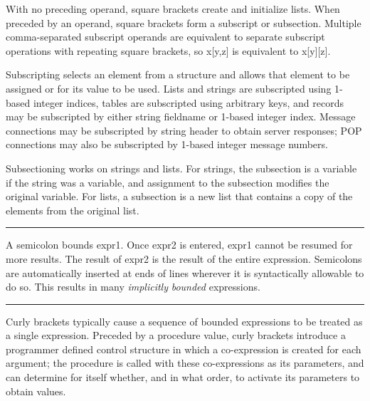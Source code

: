 \noindent
With no preceding operand, square brackets create and initialize lists.
When preceded by an operand, square brackets form a subscript or
subsection. Multiple comma-separated subscript operands are equivalent
to separate subscript operations with repeating square brackets, so
\textsf{x[y,z]} is equivalent to \textsf{x[y][z]}.

Subscripting selects an element from a structure and allows that element
to be assigned or for its value to be used. Lists and strings are
subscripted using 1-based integer indices, tables are subscripted using
arbitrary keys, and records may be subscripted by either string
fieldname or 1-based integer index. Message connections may be
subscripted by string header to obtain server responses; POP
connections may also be subscripted by 1-based integer message numbers.

Subsectioning works on strings and lists. For strings, the subsection is
a variable if the string was a variable, and
assignment to the subsection modifies the
original variable. For lists, a subsection is a new
list that contains a copy of the elements from the original list.

\bigskip\hrule\vspace{0.1cm}

\noindent
A semicolon bounds \textsf{expr1}. Once \textsf{expr2} is entered,
\textsf{expr1} cannot be resumed for more results. The result of
\textsf{expr2} is the result of the entire expression. Semicolons are automatically inserted at ends of lines
wherever it is syntactically allowable to do so. This results in many
\textit{implicitly }\textit{bounded}
expressions.

\bigskip\hrule\vspace{0.1cm}


\noindent
Curly brackets typically cause a sequence
of bounded expressions to be treated as a single expression. Preceded
by a procedure value, curly brackets introduce a programmer defined
control structure in which a co-expression is created for each
argument; the procedure is called with these co-expressions as its
parameters, and can determine for itself whether, and in what order, to
activate its parameters to obtain values.

